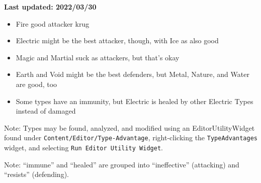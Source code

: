 

\textbf{\color{red}Last updated: 2022/03/30}

\begin{tldr}
	\begin{itemize}
		\item{Fire good attacker krug}
		\item{Electric might be the best attacker, though, with Ice as also good}
		\item{Magic and Martial suck as attackers, but that's okay}
		\item{Earth and Void might be the best defenders, but Metal, Nature, and Water are good, too}
		\item{Some types have an immunity, but Electric is healed by other Electric Types instead of damaged}
	\end{itemize}
	Note: Types may be found, analyzed, and modified using an EditorUtilityWidget found under \texttt{Content/Editor/Type-Advantage}, right-clicking the \texttt{TypeAdvantages} widget, and selecting \texttt{Run Editor Utility Widget}.
\end{tldr}


Note: ``immune'' and ``healed'' are grouped into ``ineffective'' (attacking) and ``resists'' (defending).

